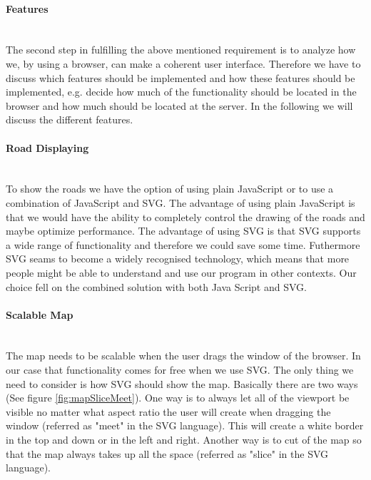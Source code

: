 \documentclass[a4paper,10pt,titlepage]{article}
\begin{document}
\paragraph{Features}\mbox{}\\
The second step in fulfilling the above mentioned requirement is to analyze how we, by using a browser, can make a coherent user interface. Therefore we have to discuss which features should be implemented and how these features should be implemented, e.g. decide how much of the functionality should be located in the browser and how much should be located at the server. In the following we will discuss the different features.

\paragraph{Road Displaying}\mbox{}\\
To show the roads we have the option of using plain JavaScript or to use a combination of JavaScript and SVG. The advantage of using plain JavaScript is that we would have the ability to completely control the drawing of the roads and maybe optimize performance. The advantage of using SVG is that SVG supports a wide range of functionality and therefore we could save some time. Futhermore SVG seams to become a widely recognised technology, which means that more people might be able to understand and use our program in other contexts. Our choice fell on the combined solution with both Java Script and SVG. 
 
\paragraph{Scalable Map}\mbox{}\\
The map needs to be scalable when the user drags the window of the browser. In our case that functionality comes for free when we use SVG. The only thing we need to consider is how SVG should show the map. Basically there are two ways (See figure \ref{fig:mapSliceMeet}). One way is to always let all of the viewport be visible no matter what aspect ratio the user will create when dragging the window (referred as "meet" in the SVG language). This will create a white border in the top and down or in the left and right. Another way is to cut of the map so that the map always takes up all the space (referred as "slice" in the SVG language). 
\end{document}
